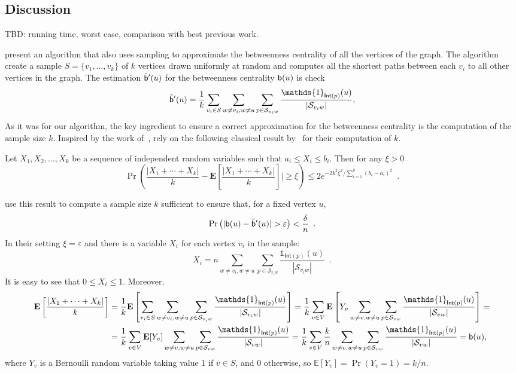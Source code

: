 \subsection{Discussion}\label{sec:discussion}
\XXX TBD: running time, worst case, comparison with best previous work.

\citet{BrandesP07,JacobKLPT05} present an algorithm that also uses sampling to approximate
the betweenness centrality of all the vertices of the graph. The algorithm
create a sample $S=\{v_1,\dotsc,v_k\}$ of $k$ vertices drawn uniformly at random 
and computes all the shortest paths between each $v_i$ to all other vertices in
the graph. The estimation $\tilde{\mathsf{b}}'(u)$ for the betweenness centrality
$\mathsf{b}(u)$ is
\XXX check
\[ 
\tilde\betw'(u)= \frac{1}{k}\sum_{v_i\in S}\sum_{w\neq v_i,w\neq
u}\sum_{p\in\mathcal{S}_{v_iw}}\frac{\mathds{1}_{\mathsf{Int}(p)}(u)}{|\mathcal{S}_{v_iw}|},
\]
As it was for our algorithm, the key ingredient to ensure a correct
approximation for the betweenness centrality is the computation of the sample
size $k$. Inspired by the work of~\citet{EppsteinW04}, \citet{BrandesP07} rely
on the following classical result by~\citet{Hoeffding63} for their computation
of $k$.

\begin{theorem}
  Let $X_1,X_2,\dotsc,X_k$ be a sequence of independent random variables
  such that $a_i\leq X_i\leq b_i$. Then for any $\xi > 0$
  \begin{equation}\label{eq:hoeffding}
    \Pr\left(\frac{|X_1+\dotsb+X_k|}{k}-\mathbf{E}\left[\frac{|X_1+\dotsb+X_k|}{k}\right]|\geq
    \xi\right)\leq 2e^{-2k^2\xi^2/\sum_{i=1}^{k}(b_{i}-a_{i})^2}\enspace.
  \end{equation}
\end{theorem}

\citet{BrandesP07} use this result to compute a sample size $k$ sufficient to ensure that, for
a fixed vertex $u$,
\[ 
\Pr\left(|\betw(u)-\tilde\betw'(u)|>\varepsilon\right)<\frac{\delta}{n}\enspace.
\]
In their setting $\xi=\varepsilon$ and there is a variable $X_i$ for
each vertex $v_i$ in the sample:
\[ 
X_i=n\sum_{w\neq v_i,w\neq
u}\sum_{p\in\mathcal{S}_{v_iw}}\frac{\mathds{1}_{\mathsf{Int}(p)}(u)}{|\mathcal{S}_{v_iw}|}\enspace
.
\]
It is easy to see that $0\le X_i\le 1$. Moreover,
\begin{align*}
\mathbf{E}\left[\frac{|X_1+\dotsb+X_k|}{k}\right] &=
\frac{1}{k}\mathbf{E}\left[\sum_{v_i\in S}\sum_{w\neq v_i,w\neq
u}\sum_{p\in\mathcal{S}_{v_iw}}\frac{\mathds{1}_{\mathsf{Int}(p)}(u)}{|\mathcal{S}_{v_iw}|}\right]
=\frac{1}{k}\sum_{v\in V}\mathbf{E}\left[Y_v\sum_{w\neq v,w\neq
u}\sum_{p\in\mathcal{S}_{vw}}\frac{\mathds{1}_{\mathsf{Int}(p)}(u)}{|\mathcal{S}_{vw}|}\right] =
\\
&=\frac{1}{k}\sum_{v\in V}\mathbf{E}[Y_v]\sum_{w\neq v,w\neq
u}\sum_{p\in\mathcal{S}_{vw}}\frac{\mathds{1}_{\mathsf{Int}(p)}(u)}{|\mathcal{S}_{vw}|}
=\frac{1}{k}\sum_{v\in V}\frac{k}{n}\sum_{w\neq v,w\neq
u}\sum_{p\in\mathcal{S}_{vw}}\frac{\mathds{1}_{\mathsf{Int}(p)}(u)}{|\mathcal{S}_{vw}|}
= \betw(u),
\end{align*}
where $Y_v$ is a Bernoulli random variable taking value 1 if $v\in S$, and 0
otherwise, so $\mathbb{E}[Y_v]=\Pr(Y_v=1)=k/n$.

